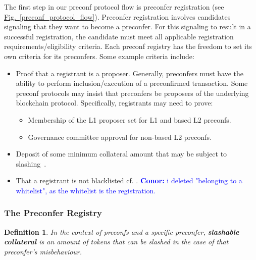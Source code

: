 \documentclass[a4paper]{article}
\theoremstyle{boldstyle}
\newtheorem{definitionx}{Definition}
\newenvironment{definition}
  {\begin{defopenboxq}\begin{definitionx}}
  {\end{definitionx}\end{defopenboxq}}
\newcommand{\cm}[1]{\textcolor{blue}{\textbf{Conor:} #1}}
\newcommand{\qb}[1]{\textcolor{red}{\textbf{Quentin:} #1}}
\newcommand{\ks}[1]{\textcolor{purple}{\textbf{Katerina:} #1}}
\begin{document}
\label{step1:preconfer_registration}
    The first step in our preconf protocol flow is preconfer registration (see \hyperref[preconf_protocol_flow]{Fig.~\ref{preconf_protocol_flow}}). Preconfer registration involves candidates signaling that they want to become a preconfer. For this signaling to result in a successful registration, the candidate must meet all applicable registration requirements/eligibility criteria. %
    Each preconf registry has the freedom to set its own criteria for its preconfers. Some example criteria include:
    \begin{itemize}
        \item Proof that a registrant is a proposer. Generally, preconfers must have the ability to perform inclusion/execution of a preconfirmed transaction. Some preconf protocols may insist that preconfers be proposers of the underlying blockchain protocol. Specifically, registrants may need to prove:
        \begin{itemize}
            \item Membership of the L1 proposer set for L1 and based L2 preconfs.
            \item Governance committee approval for non-based L2 preconfs.
        \end{itemize}
        \item Deposit of some minimum collateral amount that may be subject to slashing~\cite{W:CrediblyNeutralPreconfirmationCollateral:ThePreconfirmationRegistry, W:PreconfirmationRegistry}.
        \item That a registrant is not blacklisted cf. \cite{W:PreconfirmationFairExchange}.
        \cm{i deleted "belonging to a whitelist", as the whitelist is the registration.}
        
    \end{itemize}

        \subsubsection{The Preconfer Registry} \label{preconfer_registry}
        \begin{definition}
            In the context of preconfs and a specific preconfer, \textbf{slashable collateral} is an amount of tokens that can be slashed in the case of that preconfer's misbehaviour. 
        \end{definition}
        
\end{document}
